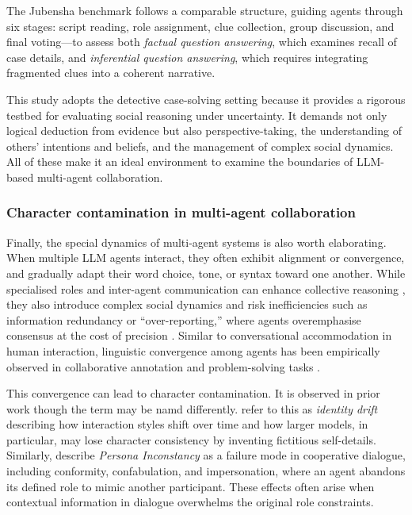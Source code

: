 \documentclass{article}
\begin{document}
The Jubensha benchmark follows a comparable structure, guiding agents through six stages: script reading, role assignment, clue collection, group discussion, and final voting—to assess both \textit{factual question answering}, which examines recall of case details, and \textit{inferential question answering}, which requires integrating fragmented clues into a coherent narrative.

This study adopts the detective case-solving setting because it provides a rigorous testbed for evaluating social reasoning under uncertainty. It demands not only logical deduction from evidence but also perspective-taking, the understanding of others' intentions and beliefs, and the management of complex social dynamics. All of these make it an ideal environment to examine the boundaries of LLM-based multi-agent collaboration.


\subsubsection{Character contamination in multi-agent collaboration}

Finally, the special dynamics of multi-agent systems is also worth elaborating. When multiple LLM agents interact, they often exhibit alignment or convergence, and gradually adapt their word choice, tone, or syntax toward one another. While specialised roles and inter-agent communication can enhance collective reasoning \citep{guo2024review}, they also introduce complex social dynamics \citep{zhu2024player} and risk inefficiencies such as information redundancy or “over-reporting,” where agents overemphasise consensus at the cost of precision \citep{guo2026collab}. Similar to conversational accommodation in human interaction, linguistic convergence among agents has been empirically observed in collaborative annotation and problem-solving tasks \citep{parfenova2025emergent, frisch2024llm}.

This convergence can lead to character contamination. It is observed in prior work though the term may be namd differently.  \citet{choi2024examining} refer to this as \textit{identity drift} describing how interaction styles shift over time and how larger models, in particular, may lose character consistency by inventing fictitious self-details. Similarly, \citet{baltaji2024cultured} describe \textit{Persona Inconstancy} as a failure mode in cooperative dialogue, including conformity, confabulation, and impersonation, where an agent abandons its defined role to mimic another participant. These effects often arise when contextual information in dialogue overwhelms the original role constraints.
\end{document}
